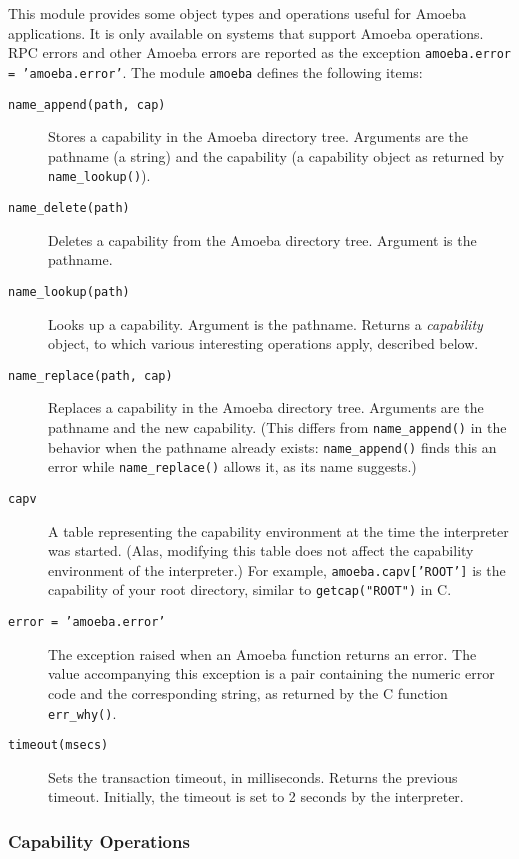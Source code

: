This module provides some object types and operations useful for
Amoeba applications.
It is only available on systems that support Amoeba operations.
RPC errors and other Amoeba errors are reported as the exception
{\tt amoeba.error = 'amoeba.error'}.
The module
{\tt amoeba}
defines the following items:
\begin{description}
\item[{\tt name\_append(path,~cap)}]
Stores a capability in the Amoeba directory tree.
Arguments are the pathname (a string) and the capability (a capability
object as returned by
{\tt name\_lookup()}).
\item[{\tt name\_delete(path)}]
Deletes a capability from the Amoeba directory tree.
Argument is the pathname.
\item[{\tt name\_lookup(path)}]
Looks up a capability.
Argument is the pathname.
Returns a
{\em capability}
object, to which various interesting operations apply, described below.
\item[{\tt name\_replace(path,~cap)}]
Replaces a capability in the Amoeba directory tree.
Arguments are the pathname and the new capability.
(This differs from
{\tt name\_append()}
in the behavior when the pathname already exists:
{\tt name\_append()}
finds this an error while
{\tt name\_replace()}
allows it, as its name suggests.)
\item[{\tt capv}]
A table representing the capability environment at the time the
interpreter was started.
(Alas, modifying this table does not affect the capability environment
of the interpreter.)
For example,
{\tt amoeba.capv['ROOT']}
is the capability of your root directory, similar to
{\tt getcap("ROOT")}
in C.
\item[{\tt error = 'amoeba.error'}]
The exception raised when an Amoeba function returns an error.
The value accompanying this exception is a pair containing the numeric
error code and the corresponding string, as returned by the C function
{\tt err\_why()}.
\item[{\tt timeout(msecs)}]
Sets the transaction timeout, in milliseconds.
Returns the previous timeout.
Initially, the timeout is set to 2 seconds by the {\Python} interpreter.
\end{description}

\subsubsection{Capability Operations}

